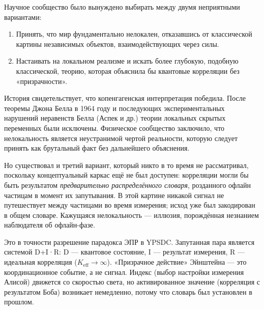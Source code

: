 \documentclass[12pt,a4paper]{article}
\begin{document}
	Научное сообщество было вынуждено выбирать между двумя неприятными вариантами:
	\begin{enumerate}
		\item Принять, что мир фундаментально нелокален, отказавшись от классической картины независимых объектов, взаимодействующих через силы.
		\item Настаивать на локальном реализме и искать более глубокую, подобную классической, теорию, которая объяснила бы квантовые корреляции без «призрачности».
	\end{enumerate}
	
	История свидетельствует, что копенгагенская интерпретация победила. После теоремы Джона Белла в 1964 году и последующих экспериментальных нарушений неравенств Белла (Аспек и др.) теории локальных скрытых переменных были исключены. Физическое сообщество заключило, что нелокальность является неустранимой чертой реальности, которую следует принять как брутальный факт без дальнейшего объяснения.
	
	Но существовал и третий вариант, который никто в то время не рассматривал, поскольку концептуальный каркас ещё не был доступен: корреляции могли бы быть результатом \emph{предварительно распределённого словаря}, розданного офлайн частицам в момент их запутывания. В этой картине никакой сигнал не путешествует между частицами во время измерения; исход уже был закодирован в общем словаре. Кажущаяся нелокальность — иллюзия, порождённая незнанием наблюдателя об офлайн-фазе.
	
	Это в точности разрешение парадокса ЭПР в YPSDC. Запутанная пара является системой D+I·R: D — квантовое состояние, I — результат измерения, R — идеальная корреляция (\(K_{\mathrm{eff}} \to \infty\)). «Призрачное действие» Эйнштейна — это координационное событие, а не сигнал. Индекс (выбор настройки измерения Алисой) движется со скоростью света, но активированное значение (корреляция с результатом Боба) возникает немедленно, потому что словарь был установлен в прошлом.
	
\end{document}
